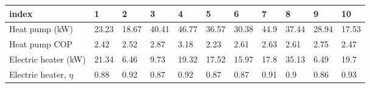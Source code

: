 \begin{tabular}{lllllllllll}
\toprule
 index & 1 & 2 & 3 & 4 & 5 & 6 & 7 & 8 & 9 & 10 \\
\midrule
 Heat pump (kW) & 23.23 & 18.67 & 40.41 & 46.77 & 36.57 & 30.38 & 44.9 & 37.44 & 28.94 & 17.53 \\
 Heat pump COP & 2.42 & 2.52 & 2.87 & 3.18 & 2.23 & 2.61 & 2.63 & 2.61 & 2.75 & 2.47 \\
 Electric heater (kW) & 21.34 & 6.46 & 9.73 & 19.32 & 17.52 & 15.97 & 17.8 & 35.13 & 6.49 & 19.7 \\
Electric heater, $\eta$ & 0.88 & 0.92 & 0.87 & 0.92 & 0.87 & 0.87 & 0.91 & 0.9 & 0.86 & 0.93 \\
\bottomrule
\end{tabular}

